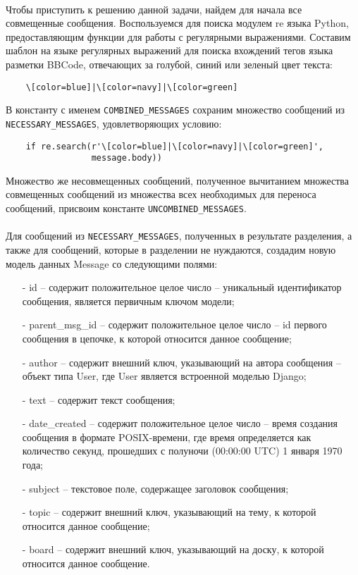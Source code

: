 \documentclass[12pt, a4paper, oneside]{article}
\begin{document}
\paragraph{}
Чтобы приступить к решению данной задачи, найдем для начала все совмещенные сообщения. Воспользуемся для поиска модулем re языка Python, предоставляющим функции для работы с регулярными выражениями. Составим шаблон на языке регулярных выражений для поиска вхождений тегов языка разметки BBCode, отвечающих за голубой, синий или зеленый цвет текста:
\begin{verbatim}
    \[color=blue]|\[color=navy]|\[color=green]
\end{verbatim}
В константу с именем \texttt{COMBINED\_MESSAGES} сохраним множество сообщений из \texttt{NECESSARY\_MESSAGES}, удовлетворяющих условию:
\begin{verbatim}
    if re.search(r'\[color=blue]|\[color=navy]|\[color=green]', 
                 message.body))
\end{verbatim}
Множество же несовмещенных сообщений, полученное вычитанием множества совмещенных сообщений из множества всех необходимых для переноса сообщений, присвоим константе \texttt{UNCOMBINED\_MESSAGES}.
\paragraph{}
Для сообщений из \texttt{NECESSARY\_MESSAGES}, полученных в результате разделения, а также для сообщений, которые в разделении не нуждаются, создадим новую модель данных Message со следующими полями:
\begin{itemize}
    \item[-] id – содержит положительное целое число – уникальный идентификатор сообщения, является первичным ключом модели;
    \item[-] parent\_msg\_id – содержит положительное целое число – id первого сообщения в цепочке, к которой относится данное сообщение;
    \item[-] author – содержит внешний ключ, указывающий на автора сообщения – объект типа User, где User является встроенной моделью Django;
    \item[-] text – содержит текст сообщения;
    \item[-] date\_created – содержит положительное целое число – время создания сообщения в формате POSIX-времени, где время определяется как количество секунд, прошедших с полуночи (00:00:00 UTC) 1 января 1970 года;
    \item[-] subject – текстовое поле, содержащее заголовок сообщения;
    \item[-] topic – содержит внешний ключ, указывающий на тему, к которой относится данное сообщение;
    \item[-] board – содержит внешний ключ, указывающий на доску, к которой относится данное сообщение.
\end{itemize}
\end{document}
